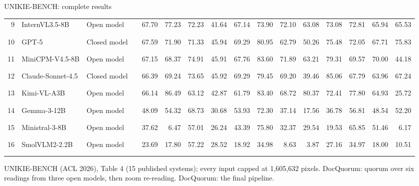 \documentclass[aspectratio=169,10pt]{beamer}
\newcommand{\src}[1]{\par\vfill{\tiny\color{muted}#1\par}}
\begin{document}
\begin{frame}{UNIKIE-BENCH: complete results}
\begin{tabularx}{\textwidth}{@{}rYl@{\hspace{6pt}}lrrrrrrrrrrrr@{}}
9 & InternVL3.5-8B & {\color{good}Open model} & \textcolor{good!45}{\rule{0.81cm}{1.05ex}} & 67.70 & 77.23 & 72.23 & 41.64 & 67.14 & 73.90 & 72.10 & 63.08 & 73.08 & 72.81 & 65.94 & 65.53\\
10 & GPT-5 & {\color{muted}Closed model} & \textcolor{muted!45}{\rule{0.81cm}{1.05ex}} & 67.59 & 71.90 & 71.33 & 45.94 & 69.29 & 80.95 & 62.79 & 50.26 & 75.48 & 72.05 & 67.71 & 75.83\\
11 & MiniCPM-V4.5-8B & {\color{good}Open model} & \textcolor{good!45}{\rule{0.81cm}{1.05ex}} & 67.15 & 68.37 & 74.91 & 45.91 & 67.76 & 83.60 & 71.89 & 63.21 & 79.31 & 69.57 & 70.00 & 44.18\\
12 & Claude-Sonnet-4.5 & {\color{muted}Closed model} & \textcolor{muted!45}{\rule{0.80cm}{1.05ex}} & 66.39 & 69.24 & 73.65 & 45.92 & 69.29 & 79.45 & 69.20 & 39.46 & 85.06 & 67.79 & 63.96 & 67.24\\
13 & Kimi-VL-A3B & {\color{good}Open model} & \textcolor{good!45}{\rule{0.79cm}{1.05ex}} & 66.14 & 86.49 & 63.12 & 42.87 & 61.79 & 83.40 & 68.72 & 80.37 & 72.41 & 77.80 & 64.93 & 25.72\\
14 & Gemma-3-12B & {\color{good}Open model} & \textcolor{good!45}{\rule{0.58cm}{1.05ex}} & 48.09 & 54.32 & 68.73 & 30.68 & 53.93 & 72.30 & 37.14 & 17.56 & 36.78 & 56.81 & 48.54 & 52.20\\
15 & Ministral-3-8B & {\color{good}Open model} & \textcolor{good!45}{\rule{0.45cm}{1.05ex}} & 37.62 & 6.47 & 57.01 & 26.24 & 43.39 & 75.80 & 32.37 & 29.54 & 19.53 & 65.85 & 51.46 & 6.17\\
16 & SmolVLM2-2.2B & {\color{good}Open model} & \textcolor{good!45}{\rule{0.28cm}{1.05ex}} & 23.69 & 17.80 & 57.22 & 28.52 & 18.92 & 34.98 & 8.63 & 3.87 & 27.16 & 34.97 & 18.00 & 10.51\\
\bottomrule\end{tabularx}\endgroup

\src{UNIKIE-BENCH (ACL 2026), Table 4 (15 published systems); every input capped at 1,605,632 pixels. DocQuorum: quorum over six readings from three open models, then zoom re-reading. DocQuorum: the final pipeline.}
\end{frame}
\end{document}
